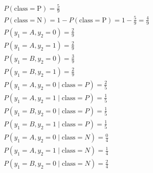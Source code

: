 \documentclass[12pt,a4paper]{article}
\begin{document}
\begin{enumerate}
	      \begin{gather*}
		      P(\text{class} = \text{P}) = \frac{5}{9}                                                                                                                       \\
		      P(\text{class} = \text{N}) = 1 - P(\text{class} = \text{P}) = 1 - \frac{5}{9} = \frac{4}{9}                                                                    \\
		      P(y_1 = A, y_2 = 0) = \frac{2}{9}                                                                                                                              \\
		      P(y_1 = A, y_2 = 1) = \frac{2}{9}                                                                                                                              \\
		      P(y_1 = B, y_2 = 0) = \frac{3}{9}                                                                                                                              \\
		      P(y_1 = B, y_2 = 1) = \frac{2}{9}                                                                                                                              \\
		      P(y_1 = A, y_2 = 0 \mid \text{class} = P) = \frac{2}{5}                                                                                                        \\
		      P(y_1 = A, y_2 = 1 \mid \text{class} = P) = \frac{1}{5}                                                                                                        \\
		      P(y_1 = B, y_2 = 0 \mid \text{class} = P) = \frac{1}{5}                                                                                                        \\
		      P(y_1 = B, y_2 = 1 \mid \text{class} = P) = \frac{1}{5}                                                                                                        \\
		      P(y_1 = A, y_2 = 0 \mid \text{class} = N) = \frac{0}{4}                                                                                                        \\
		      P(y_1 = A, y_2 = 1 \mid \text{class} = N) = \frac{1}{4}                                                                                                        \\
		      P(y_1 = B, y_2 = 0 \mid \text{class} = N) = \frac{2}{4}                                                                                                        \\

\end{gather*}
\end{enumerate}
\end{document}
